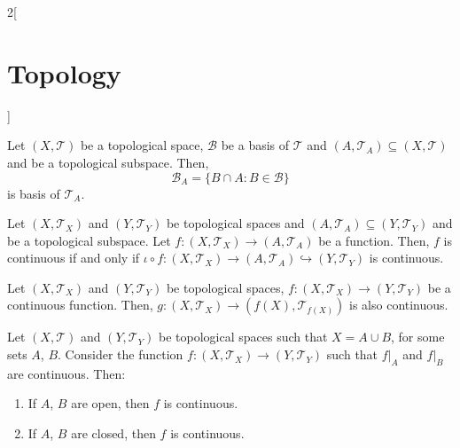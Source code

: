 \documentclass[../../../main.tex]{subfiles}
\begin{document}
\begin{multicols}{2}[\section{Topology}]
\begin{prop}
    Let $(X,\mathcal{T})$ be a topological space, $\mathcal{B}$ be a basis of $\mathcal{T}$ and $(A,\mathcal{T}_A)\subseteq (X,\mathcal{T})$ and be a topological subspace. Then, $$\mathcal{B}_A=\{B\cap A:B\in\mathcal{B}\}$$ is basis of $\mathcal{T}_A$.
  \end{prop}
  \begin{prop}
    Let $(X,\mathcal{T}_X)$ and $(Y,\mathcal{T}_Y)$ be topological spaces and $(A,\mathcal{T}_A)\subseteq (Y,\mathcal{T}_Y)$ and be a topological subspace. Let $f:(X,\mathcal{T}_X)\rightarrow (A,\mathcal{T}_A)$ be a function. Then, $f$ is continuous if and only if $\iota\circ f:(X,\mathcal{T}_X)\rightarrow (A,\mathcal{T}_A)\hookrightarrow (Y,\mathcal{T}_Y)$ is continuous.
  \end{prop}
  \begin{corollary}
    Let $(X,\mathcal{T}_X)$ and $(Y,\mathcal{T}_Y)$ be topological spaces, $f:(X,\mathcal{T}_X)\rightarrow (Y,\mathcal{T}_Y)$ be a continuous function. Then, $g:(X,\mathcal{T}_X)\rightarrow (f(X),\mathcal{T}_{f(X)})$ is also continuous.
  \end{corollary}
  \begin{prop}
    Let $(X,\mathcal{T})$ and $(Y,\mathcal{T}_Y)$ be topological spaces such that $X=A\cup B$, for some sets $A$, $B$. Consider the function $f:(X,\mathcal{T}_X)\rightarrow (Y,\mathcal{T}_Y)$ such that $f|_A$ and $f|_B$ are continuous. Then:
    \begin{enumerate}
      \item If $A$, $B$ are open, then $f$ is continuous.
      \item If $A$, $B$ are closed, then $f$ is continuous.
    \end{enumerate}
  \end{prop}

\end{multicols}
\end{document}
